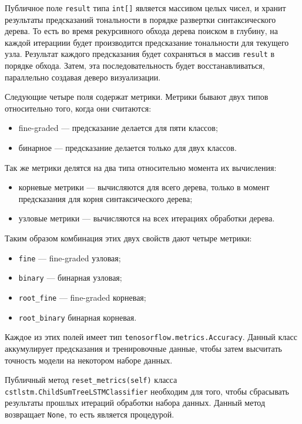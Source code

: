 Публичное поле \texttt{result} типа \texttt{int[]} является массивом целых чисел, и хранит результаты предсказаний тональности в порядке развертки синтаксического дерева. То есть во время рекурсивного обхода дерева поиском в глубину, на каждой итерациии будет производится предсказание тональности для текущего узла. Результат каждого предсказания будет сохраняться в массив \texttt{result} в порядке обхода. Затем, эта последовательность будет восстанавливаться, параллельно создавая деверо визуализации.

Следующие четыре поля содержат метрики. Метрики бывают двух типов относительно того, когда они считаются:
\begin{itemize}
\item fine-graded --- предсказание делается для пяти классов;
\item бинарное --- предсказание делается только для двух классов.
\end{itemize}

Так же метрики делятся на два типа относительно момента их вычисления:
\begin{itemize}
\item корневые метрики --- вычисляются для всего дерева, только в момент предсказания для корня синтаксического дерева;
\item узловые метрики --- вычисляются на всех итерациях обработки дерева.
\end{itemize}

Таким образом комбинация этих двух свойств дают четыре метрики:
\begin{itemize}
\item \texttt{fine} --- fine-graded узловая;
\item \texttt{binary} --- бинарная узловая;
\item \texttt{root\_fine} --- fine-graded корневая;
\item \texttt{root\_binary} бинарная корневая.
\end{itemize}

Каждое из этих полей имеет тип \texttt{tenosorflow.metrics.Accuracy}. Данный класс аккумулирует предсказания и тренировочные данные, чтобы затем высчитать точность модели на некотором наборе данных.

Публичный метод \texttt{reset\_metrics(self)} класса \texttt{cstlstm.ChildSumTre\-eLSTMClassifier} необходим для того, чтобы сбрасывать результаты прошлых итераций обработки набора данных. Данный метод возвращает \texttt{None}, то есть является процедурой.

